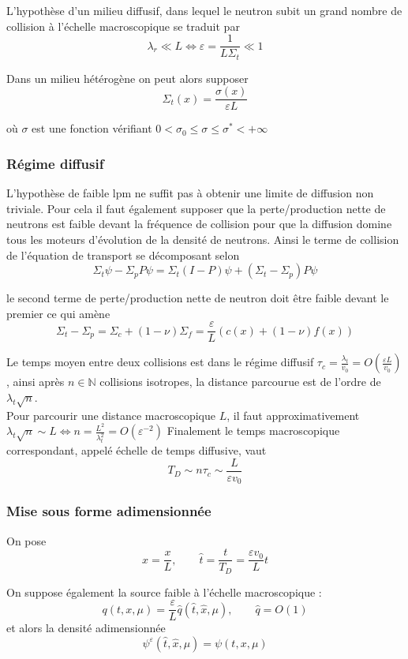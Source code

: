 \documentclass{article}
\begin{document}
L'hypothèse d'un milieu diffusif, dans lequel le neutron subit un grand nombre de collision à l'échelle macroscopique se traduit par 
\begin{equation}
    \lambda_r \ll L \iff \varepsilon = \frac{1}{L\Sigma_t} \ll 1
\end{equation}

Dans un milieu hétérogène on peut alors supposer 
\[
\Sigma_t(x) = \frac{\sigma(x)}{\varepsilon L}
\]

où \(\sigma\) est une fonction vérifiant \(0 < \sigma_0 \le \sigma \le \sigma^* < +\infty   \)

\subsubsection{Régime diffusif}
L'hypothèse de faible lpm ne suffit pas à obtenir une limite de diffusion non triviale. Pour cela il faut également supposer que la perte/production nette de neutrons est faible devant la fréquence de collision pour que la diffusion domine tous les moteurs d'évolution de la densité de neutrons. Ainsi le terme de collision de l'équation de transport se décomposant selon 
\[
\Sigma_t\psi - \Sigma_pP\psi = \Sigma_t(I-P)\psi + (\Sigma_t-\Sigma_p)P\psi 
\]

le second terme de perte/production nette de neutron doit être faible devant le premier ce qui amène 
\[
\Sigma_t-\Sigma_p = \Sigma_c +(1-\nu)\Sigma_f = \frac{\varepsilon}{L}(c(x)+(1-\nu)f(x)
)\]

Le temps moyen entre deux collisions est dans le régime diffusif \(\tau_c = \frac{\lambda_t}{v_0} = O(\frac{\varepsilon L}{v_0})\), ainsi après \(n \in \mathbb{N}\) collisions isotropes, la distance parcourue est de l'ordre de \(\lambda_t\sqrt{n}\).\\
Pour parcourir une distance macroscopique \(L\), il faut approximativement \(\lambda_t\sqrt{n} \sim L \iff n = \frac{L^2}{\lambda_t^2} = O(\varepsilon^{-2})\)
Finalement le temps macroscopique correspondant, appelé échelle de temps diffusive, vaut 
\[
T_D \sim n\tau_c \sim \frac{L}{\varepsilon v_0}
\]

\subsubsection{Mise sous forme adimensionnée}
On pose 
\[
\hat{x}= \frac{x}{L}, \qquad \hat{t} = \frac{t}{T_D} = \frac{\varepsilon v_0}{L}t
\]

On suppose également la source faible à l'échelle macroscopique :
\[
q(t,x,\mu) = \frac{\varepsilon}{L}\hat{q}(\hat{t},\hat{x},\mu), \qquad \hat{q} = O(1)
\]
et alors la densité adimensionnée 
\[
\psi^{\varepsilon}(\hat{t},\hat{x},\mu) = \psi(t,x,\mu)
\]
\end{document}
